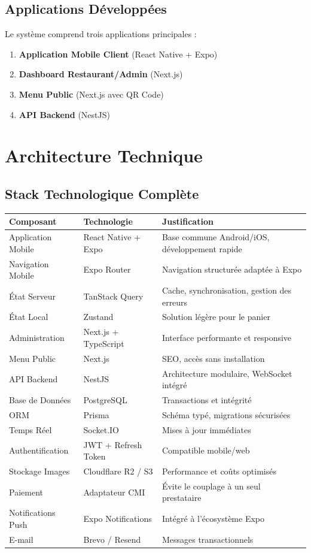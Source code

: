 \documentclass[11pt,a4paper]{article}
\begin{document}
\subsection{Applications Développées}

Le système comprend trois applications principales :
\begin{enumerate}
    \item \textbf{Application Mobile Client} (React Native + Expo)
    \item \textbf{Dashboard Restaurant/Admin} (Next.js)
    \item \textbf{Menu Public} (Next.js avec QR Code)
    \item \textbf{API Backend} (NestJS)
\end{enumerate}

\section{Architecture Technique}

\subsection{Stack Technologique Complète}

\begin{longtable}{|p{4cm}|p{4cm}|p{6cm}|}
\hline
\textbf{Composant} & \textbf{Technologie} & \textbf{Justification} \\
\hline
Application Mobile & React Native + Expo & Base commune Android/iOS, développement rapide \\
\hline
Navigation Mobile & Expo Router & Navigation structurée adaptée à Expo \\
\hline
État Serveur & TanStack Query & Cache, synchronisation, gestion des erreurs \\
\hline
État Local & Zustand & Solution légère pour le panier \\
\hline
Administration & Next.js + TypeScript & Interface performante et responsive \\
\hline
Menu Public & Next.js & SEO, accès sans installation \\
\hline
API Backend & NestJS & Architecture modulaire, WebSocket intégré \\
\hline
Base de Données & PostgreSQL & Transactions et intégrité \\
\hline
ORM & Prisma & Schéma typé, migrations sécurisées \\
\hline
Temps Réel & Socket.IO & Mises à jour immédiates \\
\hline
Authentification & JWT + Refresh Token & Compatible mobile/web \\
\hline
Stockage Images & Cloudflare R2 / S3 & Performance et coûts optimisés \\
\hline
Paiement & Adaptateur CMI & Évite le couplage à un seul prestataire \\
\hline
Notifications Push & Expo Notifications & Intégré à l'écosystème Expo \\
\hline
E-mail & Brevo / Resend & Messages transactionnels \\
\hline
\end{longtable}
\end{document}
